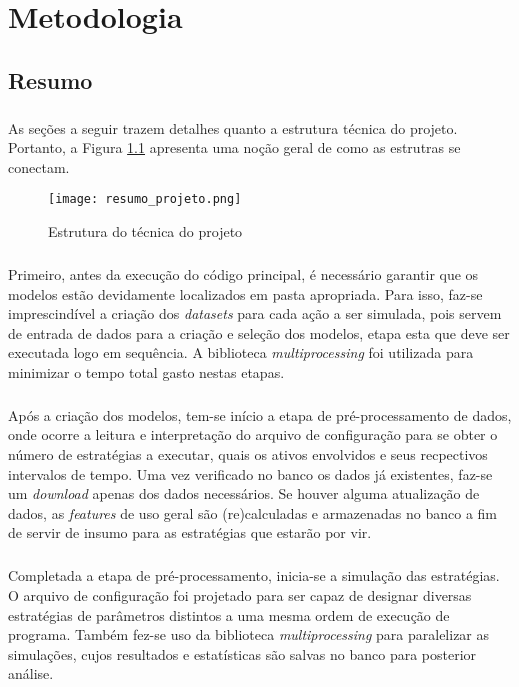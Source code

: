 \chapter{Metodologia}
\label{cap3}

\section{Resumo}

\paragraph{} As seções a seguir trazem detalhes quanto a estrutura técnica do projeto. Portanto, a Figura \ref{fig:100} apresenta uma noção geral de como as estrutras se conectam.

\begin{figure}[h]
    \texttt{[image: resumo\_projeto.png]}
    \centering
    \caption{Estrutura do técnica do projeto}
    \label{fig:100}
\end{figure}

\paragraph{} Primeiro, antes da execução do código principal, é necessário garantir que os modelos estão devidamente localizados em pasta apropriada. Para isso, faz-se imprescindível a criação dos \textit{datasets} para cada ação a ser simulada, pois servem de entrada de dados para a criação e seleção dos modelos, etapa esta que deve ser executada logo em sequência. A biblioteca \textit{multiprocessing} foi utilizada para minimizar o tempo total gasto nestas etapas.

\paragraph{} Após a criação dos modelos, tem-se início a etapa de pré-processamento de dados, onde ocorre a leitura e interpretação do arquivo de configuração para se obter o número de estratégias a executar, quais os ativos envolvidos e seus recpectivos intervalos de tempo. Uma vez verificado no banco os dados já existentes, faz-se um \textit{download} apenas dos dados necessários. Se houver alguma atualização de dados, as \textit{features} de uso geral são (re)calculadas e armazenadas no banco a fim de servir de insumo para as estratégias que estarão por vir.

\paragraph{} Completada a etapa de pré-processamento, inicia-se a simulação das estratégias. O arquivo de configuração foi projetado para ser capaz de designar diversas estratégias de parâmetros distintos a uma mesma ordem de execução de programa. Também fez-se uso da biblioteca \textit{multiprocessing} para paralelizar as simulações, cujos resultados e estatísticas são salvas no banco para posterior análise.

